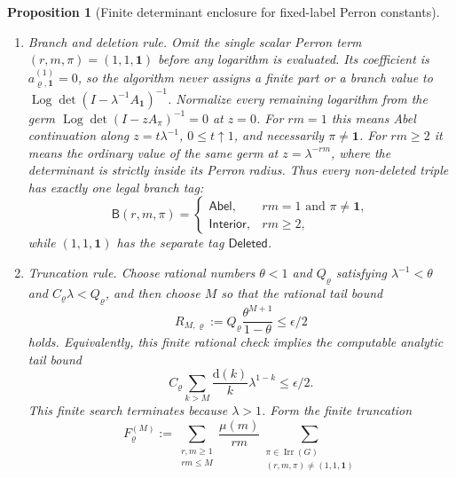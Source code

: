\documentclass[11pt,a4paper]{amsart}
\theoremstyle{plain}
\newtheorem{proposition}[theorem]{Proposition}
\theoremstyle{definition}
\theoremstyle{remark}
\DeclareMathOperator{\Irr}{Irr}
\DeclareMathOperator{\Log}{Log}
\begin{document}
\begin{proposition}[Finite determinant enclosure for fixed-label Perron constants]
\begin{enumerate}[label=\textup{(\alph*)},leftmargin=*]
      realness.
    \item \emph{Branch and deletion rule.}  Omit the single scalar Perron term
      \((r,m,\pi)=(1,1,\mathbf1)\) before any logarithm is evaluated.  Its
      coefficient is
      \(a_{\varrho,\mathbf1}^{(1)}=0\), so the algorithm never assigns a
      finite part or a branch value to
      \(\Log\det(I-\lambda^{-1}A_{\mathbf1})^{-1}\).
      Normalize every remaining logarithm from the germ
      \(\Log\det(I-zA_\pi)^{-1}=0\) at \(z=0\).  For \(rm=1\) this means
      Abel continuation along \(z=t\lambda^{-1}\), \(0\le t\uparrow1\), and
      necessarily \(\pi\neq\mathbf1\).  For \(rm\ge2\) it means the ordinary
      value of the same germ at \(z=\lambda^{-rm}\), where the determinant
      is strictly inside its Perron radius.  Thus every non-deleted triple has
      exactly one legal branch tag:
      \[
        \mathsf B(r,m,\pi)=
        \begin{cases}
          \mathsf{Abel},& rm=1\text{ and }\pi\ne\mathbf1,\\
          \mathsf{Interior},& rm\ge2,
        \end{cases}
      \]
      while \((1,1,\mathbf1)\) has the separate tag \(\mathsf{Deleted}\).
    \item \emph{Truncation rule.}  Choose rational numbers \(\theta<1\) and
      \(Q_\varrho\) satisfying \(\lambda^{-1}<\theta\) and
      \(C_\varrho\lambda<Q_\varrho\), and then choose \(M\) so that the rational
      tail bound
      \begin{equation}\label{eq:fixed-label-perron-finite-algorithm-rational-tail-choice}
        R_{M,\varrho}:=Q_\varrho\frac{\theta^{M+1}}{1-\theta}\le \epsilon/2
      \end{equation}
      holds.  Equivalently, this finite rational check implies the computable
      analytic tail bound
      \begin{equation}\label{eq:fixed-label-perron-finite-algorithm-tail-choice}
        C_\varrho
        \sum_{k>M}\frac{\mathrm d(k)}{k}\lambda^{1-k}
        \le \epsilon/2 .
      \end{equation}
      This finite search terminates because \(\lambda>1\).  Form the finite
      truncation
      \begin{equation}\label{eq:fixed-label-perron-finite-algorithm-truncation}
        F_\varrho^{(M)}
        :=
        \sum_{\substack{r,m\ge1\\rm\le M}}
        \frac{\mu(m)}{rm}
        \sum_{\substack{\pi\in\Irr(G)\\(r,m,\pi)\neq(1,1,\mathbf1)}}

\end{equation}
\end{enumerate}
\end{proposition}
\end{document}
